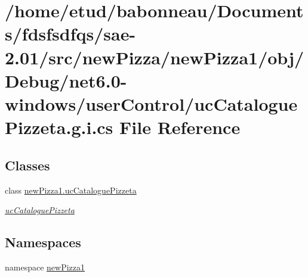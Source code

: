 \hypertarget{net6_80-windows_2userControl_2ucCataloguePizzeta_8g_8i_8cs}{}\section{/home/etud/babonneau/\+Documents/fdsfsdfqs/sae-\/2.01/src/new\+Pizza/new\+Pizza1/obj/\+Debug/net6.0-\/windows/user\+Control/uc\+Catalogue\+Pizzeta.g.\+i.\+cs File Reference}
\label{net6_80-windows_2userControl_2ucCataloguePizzeta_8g_8i_8cs}
\subsection*{Classes}
\begin{DoxyCompactItemize}
\item 
class \hyperlink{classnewPizza1_1_1ucCataloguePizzeta}{new\+Pizza1.\+uc\+Catalogue\+Pizzeta}
\begin{DoxyCompactList}\small\item\em \hyperlink{classnewPizza1_1_1ucCataloguePizzeta}{uc\+Catalogue\+Pizzeta} \end{DoxyCompactList}\end{DoxyCompactItemize}
\subsection*{Namespaces}
\begin{DoxyCompactItemize}
\item 
namespace \hyperlink{namespacenewPizza1}{new\+Pizza1}
\end{DoxyCompactItemize}
